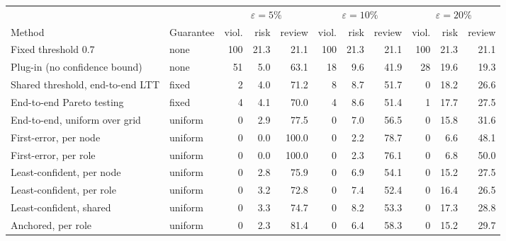 \begin{tabular}{llrrrrrrrrr}
\toprule
 & & \multicolumn{3}{c}{$\varepsilon=5\%$} & \multicolumn{3}{c}{$\varepsilon=10\%$} & \multicolumn{3}{c}{$\varepsilon=20\%$} \\
\cmidrule(lr){3-5}\cmidrule(lr){6-8}\cmidrule(lr){9-11}
Method & Guarantee & viol. & risk & review & viol. & risk & review & viol. & risk & review \\
\midrule
Fixed threshold 0.7 & none & 100 & 21.3 & 21.1 & 100 & 21.3 & 21.1 & 100 & 21.3 & 21.1 \\
Plug-in (no confidence bound) & none & 51 & 5.0 & 63.1 & 18 & 9.6 & 41.9 & 28 & 19.6 & 19.3 \\
\midrule
Shared threshold, end-to-end LTT & fixed & 2 & 4.0 & 71.2 & 8 & 8.7 & 51.7 & 0 & 18.2 & 26.6 \\
End-to-end Pareto testing & fixed & 4 & 4.1 & 70.0 & 4 & 8.6 & 51.4 & 1 & 17.7 & 27.5 \\
End-to-end, uniform over grid & uniform & 0 & 2.9 & 77.5 & 0 & 7.0 & 56.5 & 0 & 15.8 & 31.6 \\
\midrule
First-error, per node & uniform & 0 & 0.0 & 100.0 & 0 & 2.2 & 78.7 & 0 & 6.6 & 48.1 \\
First-error, per role & uniform & 0 & 0.0 & 100.0 & 0 & 2.3 & 76.1 & 0 & 6.8 & 50.0 \\
\midrule
Least-confident, per node & uniform & 0 & 2.8 & 75.9 & 0 & 6.9 & 54.1 & 0 & 15.2 & 27.5 \\
Least-confident, per role & uniform & 0 & 3.2 & 72.8 & 0 & 7.4 & 52.4 & 0 & 16.4 & 26.5 \\
Least-confident, shared & uniform & 0 & 3.3 & 74.7 & 0 & 8.2 & 53.3 & 0 & 17.3 & 28.8 \\
Anchored, per role & uniform & 0 & 2.3 & 81.4 & 0 & 6.4 & 58.3 & 0 & 15.2 & 29.7 \\
\bottomrule
\end{tabular}
